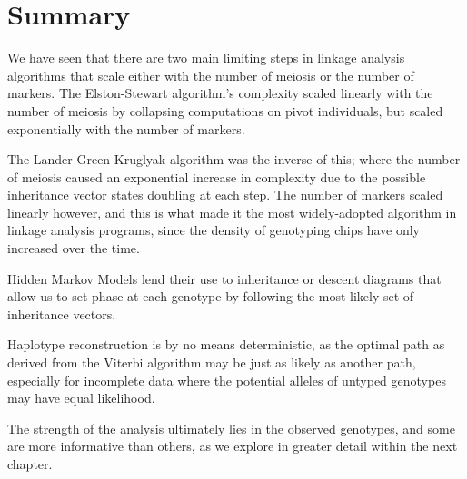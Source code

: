 \section{Summary}


We have seen that there are two main limiting steps in linkage analysis algorithms that scale either with the number of meiosis or the number of markers. The Elston-Stewart algorithm's complexity scaled linearly with the number of meiosis by collapsing computations on pivot individuals, but scaled exponentially with the number of markers. 

The Lander-Green-Kruglyak algorithm was the inverse of this; where  the number of meiosis caused an exponential increase in complexity due to the possible inheritance vector states doubling at each step.  The number of markers scaled linearly however, and this is what made it the most widely-adopted algorithm in linkage analysis programs, since the density of genotyping chips have only increased over the time.

Hidden Markov Models lend their use to inheritance or descent diagrams that allow us to set phase at each genotype by following the most likely set of inheritance vectors.

Haplotype reconstruction is by no means deterministic, as the optimal path as derived from the Viterbi algorithm may be just as likely as another path, especially for incomplete data where the potential alleles of untyped genotypes may have equal likelihood.


The strength of the analysis ultimately lies in the observed genotypes, and some are more informative than others, as we explore in greater detail within the next chapter.


































